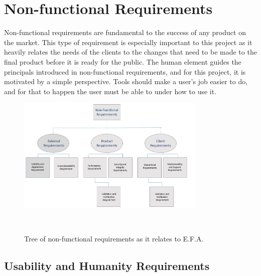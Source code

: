 \documentclass[12pt]{report}
\begin{document}
\chapter{Non-functional Requirements}\label{ch:NonFunc}
Non-functional requirements are fundamental to the success of any product on the market. This type 
of requirement is especially important to this project as it heavily relates the needs of the 
clients to the changes that need to be made to the final product before it is ready for the public. 
The human element guides the principals introduced in non-functional requirements, and for this 
project, it is motivated by a simple perspective. Tools should make a user’s job easier to do, and 
for that to happen the user must be able to under how to use it. 
\begin{figure}[!htb]
	\centering
	\includegraphics[width=0.8\textwidth]{../figures/NONFUNCTIONAL}
	\caption{Tree of non-functional requirements as it relates to E.F.A.}~\label{fig:figure2}
\end{figure}
\section{Usability and Humanity Requirements}\label{sec:Usability}
\end{document}
